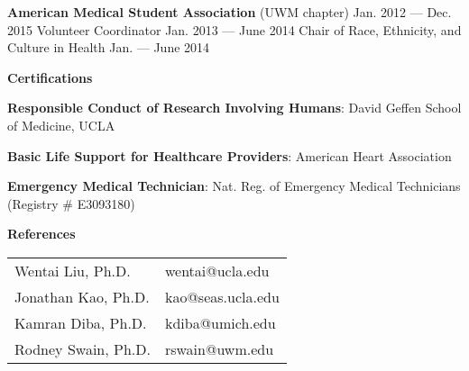 \documentclass[10pt, oneside]{article}
\begin{document}
	 \textbf{American Medical Student Association}  (UWM chapter) \hfill{Jan. 2012 --- Dec. 2015} \newline
	 \phantom{9mm}Volunteer Coordinator \hfill{Jan. 2013 --- June 2014} \newline
	 \phantom{9mm}Chair of Race, Ethnicity, and Culture in Health \hfill{Jan. --- June 2014}  
	 
{\Large \textbf{Certifications}} \hrulefill

    \textbf{Responsible Conduct of Research Involving Humans}:  David Geffen School of Medicine, UCLA
 

	  \textbf{Basic Life Support for Healthcare Providers}: American Heart Association
	  
	 \textbf{Emergency Medical Technician}: Nat. Reg. of Emergency Medical Technicians (Registry \# E3093180)

{\Large \textbf{References}} \hrulefill
\begin{table}[h!]
    \begin{tabular}{ll}
         Wentai Liu, Ph.D. &\faEnvelope{} wentai@ucla.edu \\
Jonathan Kao, Ph.D. &  \faEnvelope{} kao@seas.ucla.edu\\
Kamran Diba, Ph.D. &\faEnvelope{} kdiba@umich.edu \\
Rodney Swain, Ph.D. & \faEnvelope{} rswain@uwm.edu   
    \end{tabular}
\end{table}



\end{document}
